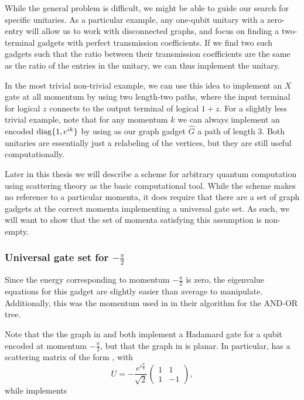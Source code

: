 \documentclass[../thesis-main/thesis-main]{subfiles}
\begin{document}
While the general problem is difficult, we might be able to guide our search for specific unitaries.  As a particular example, any one-qubit unitary with a zero-entry will allow us to work with disconnected graphs, and focus on finding a two-terminal gadgets with perfect transmission coefficients.  If we find two such gadgets such that the ratio between their transmission coefficients are the same as the ratio of the entries in the unitary, we can thus implement the unitary.

In the most trivial non-trivial example, we can use this idea to implement an $X$ gate at all momentum by using two length-two paths, where the input terminal for logical $z$ connects to the output terminal of logical $1+z$.  For a slightly less trivial example, note that for any momentum $k$ we can always implement an encoded $\operatorname{diag}\{1,e^{i k}\}$ by using as our graph gadget $\widehat{G}$ a path of length $3$.  Both unitaries are essentially just a relabeling of the vertices, but they are still useful computationally.  


Later in this thesis we will describe a scheme for arbitrary quantum computation using scattering theory as the basic computational tool.  While the scheme makes no reference to a particular momenta, it does require that there are a set of graph gadgets at the correct momenta implementing a universal gate set.  As such, we will want to show that the set of momenta satisfying this assumption is non-empty.

\subsubsection{Universal gate set for $-\frac{\pi}{2}$}

Since the energy corresponding to momentum $-\frac{\pi}{2}$ is zero, the eigenvalue equations for this gadget are slightly easier than average to manipulate.  Additionally, this was the momentum used in \cite{FGG08} in their algorithm for the AND-OR tree.

Note that the the graph in  and  both implement a Hadamard gate for a qubit encoded at momentum $-\frac{\pi}{2}$, but that the graph in  is planar.  In particular,  has a scattering matrix of the form , with
\begin{equation}
  U = -\frac{e^{i \frac{\pi}{4}}}{\sqrt{2}}\begin{pmatrix}
    1 & 1\\
    1 & -1 
  \end{pmatrix}, 
\end{equation}  
while  implements
\end{document}
